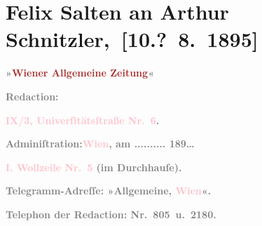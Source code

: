 

\renewcommand{\erwaehnteInstitutionen}{Institutionen: Wiener Allgemeine Zeitung}
\renewcommand{\erwaehnteOrte}{Orte: Bad Ischl, Hörlgasse, Universitätsstraße, Wien, Wollzeile}
\renewcommand{\erwaehnteWerke}{}
\section[ Felix Salten an Arthur Schnitzler, {[}10.? 8. 1895{]}]{Felix Salten an Arthur Schnitzler, {[}10.? 8. 1895{]}}
\nopagebreak{}
\rehead{ }\normalsize\beginnumbering{}
\toendnotes[C]{\smallbreak\pagebreak[2]}
\toendnotes[C]{\smallbreak}
\pstart
           \noindent{}{\pb}\textcolor{gray}{\textbf{\textbf{»\textcolor{brown}{Wiener Allgemeine
                        Zeitung}{}\ledrightnote{\textcolor{brown}{Wiener Allgemeine Zeitung}}«}}}\pend
           
\pstart
           \textcolor{gray}{\textbf{Redaction:}}\pend
           
\pstart
           \textcolor{gray}{\textbf{\textbf{\textcolor{pink}{IX/3, Univerſitätsſtraße Nr. 6}{}\ledrightnote{\textcolor{pink}{Universitätsstraße}}.}}}\pend
           
\pstart
           \textcolor{gray}{\textbf{Adminiſtration:}}\hfill \textcolor{gray}{\textbf{\textcolor{pink}{Wien}{}\ledrightnote{\textcolor{pink}{Wien}}, am ..........{ }189{\dots}}}\pend
           
\pstart
           \textcolor{gray}{\textbf{\textbf{\textcolor{pink}{I. Wollzeile Nr. 5}{}\ledrightnote{\textcolor{pink}{Wollzeile}}} (im Durchhauſe).}}\pend
           
\pstart
           \textcolor{gray}{\textbf{Telegramm-Adreſſe: »Allgemeine, \textcolor{pink}{Wien}{}\ledrightnote{\textcolor{pink}{Wien}}«.}}\pend
           
\pstart
           \textcolor{gray}{\textbf{Telephon der Redaction: Nr. 805 u. 2180.}}\pend
           
